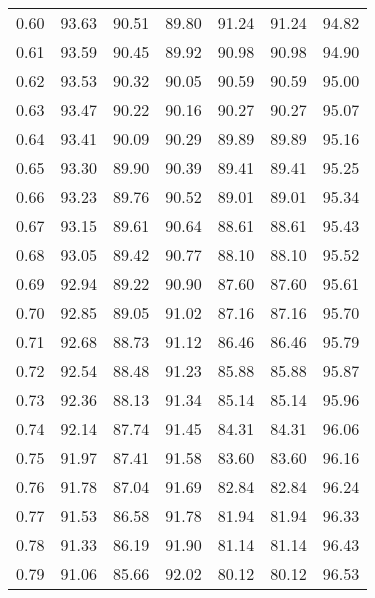 \begin{tabular}{|c|c|c|c|c|c|c|}
      0.60 &     93.63 &     90.51 &      89.80 &   91.24 &      91.24 &         94.82 \\
      0.61 &     93.59 &     90.45 &      89.92 &   90.98 &      90.98 &         94.90 \\
      0.62 &     93.53 &     90.32 &      90.05 &   90.59 &      90.59 &         95.00 \\
      0.63 &     93.47 &     90.22 &      90.16 &   90.27 &      90.27 &         95.07 \\
      0.64 &     93.41 &     90.09 &      90.29 &   89.89 &      89.89 &         95.16 \\
      0.65 &     93.30 &     89.90 &      90.39 &   89.41 &      89.41 &         95.25 \\
      0.66 &     93.23 &     89.76 &      90.52 &   89.01 &      89.01 &         95.34 \\
      0.67 &     93.15 &     89.61 &      90.64 &   88.61 &      88.61 &         95.43 \\
      0.68 &     93.05 &     89.42 &      90.77 &   88.10 &      88.10 &         95.52 \\
      0.69 &     92.94 &     89.22 &      90.90 &   87.60 &      87.60 &         95.61 \\
      0.70 &     92.85 &     89.05 &      91.02 &   87.16 &      87.16 &         95.70 \\
      0.71 &     92.68 &     88.73 &      91.12 &   86.46 &      86.46 &         95.79 \\
      0.72 &     92.54 &     88.48 &      91.23 &   85.88 &      85.88 &         95.87 \\
      0.73 &     92.36 &     88.13 &      91.34 &   85.14 &      85.14 &         95.96 \\
      0.74 &     92.14 &     87.74 &      91.45 &   84.31 &      84.31 &         96.06 \\
      0.75 &     91.97 &     87.41 &      91.58 &   83.60 &      83.60 &         96.16 \\
      0.76 &     91.78 &     87.04 &      91.69 &   82.84 &      82.84 &         96.24 \\
      0.77 &     91.53 &     86.58 &      91.78 &   81.94 &      81.94 &         96.33 \\
      0.78 &     91.33 &     86.19 &      91.90 &   81.14 &      81.14 &         96.43 \\
      0.79 &     91.06 &     85.66 &      92.02 &   80.12 &      80.12 &         96.53 \\

\end{tabular}
